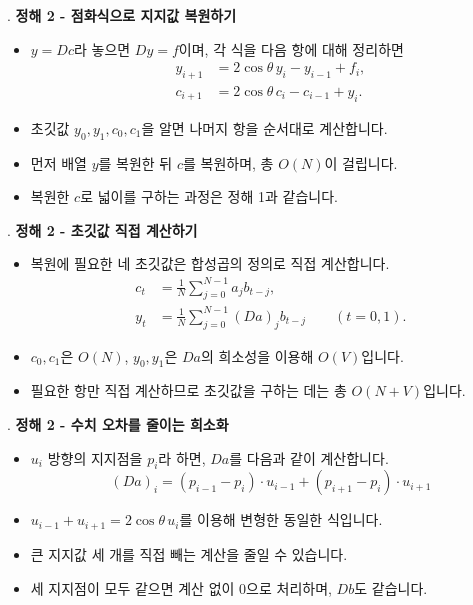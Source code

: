 \begin{frame}{\textbf{\pletter}. \ptitle}
    \textbf{정해 2 - 점화식으로 지지값 복원하기}
    \begin{itemize}
        \item $y=Dc$라 놓으면 $Dy=f$이며, 각 식을 다음 항에 대해 정리하면
        \[
            \begin{aligned}
                y_{i+1}&=2\cos\theta\,y_i-y_{i-1}+f_i,\\
                c_{i+1}&=2\cos\theta\,c_i-c_{i-1}+y_i.
            \end{aligned}
        \]
        \item 초깃값 $y_0,y_1,c_0,c_1$을 알면 나머지 항을 순서대로 계산합니다.
        \item 먼저 배열 $y$를 복원한 뒤 $c$를 복원하며, 총 $O(N)$이 걸립니다.
        \item 복원한 $c$로 넓이를 구하는 과정은 정해 1과 같습니다.
    \end{itemize}
\end{frame}

\begin{frame}{\textbf{\pletter}. \ptitle}
    \textbf{정해 2 - 초깃값 직접 계산하기}
    \begin{itemize}
        \item 복원에 필요한 네 초깃값은 합성곱의 정의로 직접 계산합니다.
        \[
            \begin{aligned}
                c_t&=\frac1N\sum_{j=0}^{N-1}a_jb_{t-j},\\
                y_t&=\frac1N\sum_{j=0}^{N-1}(Da)_jb_{t-j}
                \qquad(t=0,1).
            \end{aligned}
        \]
        \item $c_0,c_1$은 $O(N)$, $y_0,y_1$은 $Da$의 희소성을 이용해 $O(V)$입니다.
        \item 필요한 항만 직접 계산하므로 초깃값을 구하는 데는 총 $O(N+V)$입니다.
    \end{itemize}
\end{frame}

\begin{frame}{\textbf{\pletter}. \ptitle}
    \textbf{정해 2 - 수치 오차를 줄이는 희소화}
    \begin{itemize}
        \item $u_i$ 방향의 지지점을 $p_i$라 하면, $Da$를 다음과 같이 계산합니다.
        \[
            (Da)_i
            =(p_{i-1}-p_i)\cdot u_{i-1}
            +(p_{i+1}-p_i)\cdot u_{i+1}
        \]
        \item $u_{i-1}+u_{i+1}=2\cos\theta\,u_i$를 이용해 변형한 동일한 식입니다.
        \item 큰 지지값 세 개를 직접 빼는 계산을 줄일 수 있습니다.
        \item 세 지지점이 모두 같으면 계산 없이 $0$으로 처리하며, $Db$도 같습니다.
    \end{itemize}
\end{frame}

